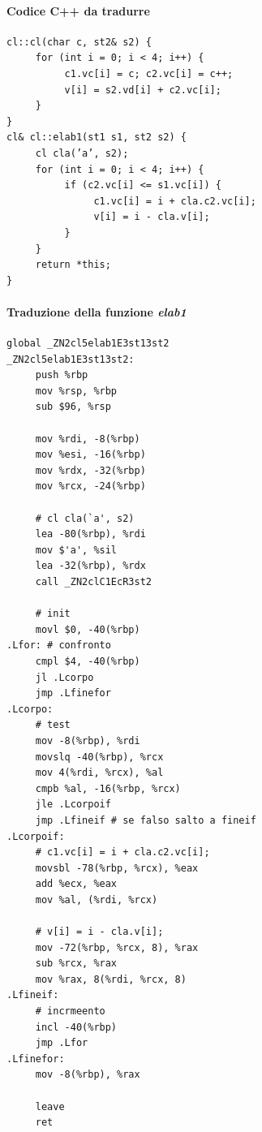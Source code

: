 \documentclass[11pt]{report}
\theoremstyle{definition}
\begin{document}
\paragraph{Codice C++ da tradurre}
\begin{verbatim}
cl::cl(char c, st2& s2) {
     for (int i = 0; i < 4; i++) {
          c1.vc[i] = c; c2.vc[i] = c++;
          v[i] = s2.vd[i] + c2.vc[i];
     }
}
cl& cl::elab1(st1 s1, st2 s2) {
     cl cla(’a’, s2);
     for (int i = 0; i < 4; i++) {
          if (c2.vc[i] <= s1.vc[i]) {
               c1.vc[i] = i + cla.c2.vc[i];
               v[i] = i - cla.v[i];    
          }
     }
     return *this;
}
\end{verbatim}
\paragraph{Traduzione della funzione \emph{elab1}}
\begin{verbatim}
global _ZN2cl5elab1E3st13st2
_ZN2cl5elab1E3st13st2:
     push %rbp
     mov %rsp, %rbp
     sub $96, %rsp
     
     mov %rdi, -8(%rbp)
     mov %esi, -16(%rbp)
     mov %rdx, -32(%rbp)
     mov %rcx, -24(%rbp)
     
     # cl cla(`a', s2)     
     lea -80(%rbp), %rdi
     mov $'a', %sil
     lea -32(%rbp), %rdx
     call _ZN2clC1EcR3st2
     
     # init
     movl $0, -40(%rbp)
.Lfor: # confronto
     cmpl $4, -40(%rbp)
     jl .Lcorpo
     jmp .Lfinefor
.Lcorpo:
     # test
     mov -8(%rbp), %rdi
     movslq -40(%rbp), %rcx
     mov 4(%rdi, %rcx), %al
     cmpb %al, -16(%rbp, %rcx)
     jle .Lcorpoif
     jmp .Lfineif # se falso salto a fineif
.Lcorpoif:
     # c1.vc[i] = i + cla.c2.vc[i];
     movsbl -78(%rbp, %rcx), %eax
     add %ecx, %eax
     mov %al, (%rdi, %rcx)
     
     # v[i] = i - cla.v[i];    
     mov -72(%rbp, %rcx, 8), %rax
     sub %rcx, %rax
     mov %rax, 8(%rdi, %rcx, 8)
.Lfineif:
     # incrmeento
     incl -40(%rbp)
     jmp .Lfor
.Lfinefor:
     mov -8(%rbp), %rax
     
     leave
     ret
\end{verbatim}
\end{document}
